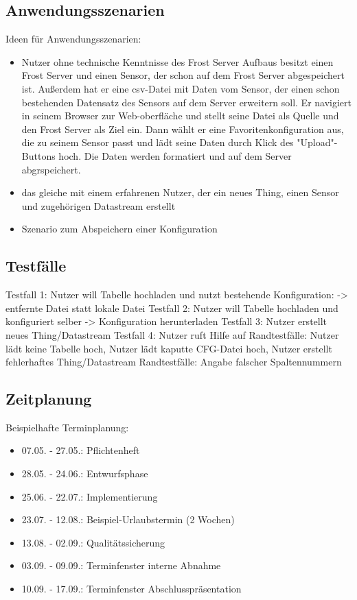 \documentclass[12 pt]{article}
\begin{document}
\subsection{Anwendungsszenarien}
Ideen für Anwendungsszenarien:
\begin{itemize}
\item Nutzer ohne technische Kenntnisse des Frost Server Aufbaus besitzt einen Frost Server und einen Sensor, der schon auf dem Frost Server abgespeichert ist. Außerdem hat er eine csv-Datei mit Daten vom Sensor, der einen schon bestehenden Datensatz des Sensors auf dem Server erweitern soll. Er navigiert in seinem Browser zur Web-oberfläche und stellt seine Datei als Quelle und den Frost Server als Ziel ein. Dann wählt er eine Favoritenkonfiguration aus, die zu seinem Sensor passt und lädt seine Daten durch Klick des "Upload"-Buttons hoch. Die Daten werden formatiert und auf dem Server abgrspeichert.
\item das gleiche mit einem erfahrenen Nutzer, der ein neues Thing, einen Sensor und zugehörigen Datastream erstellt
\item Szenario zum Abspeichern einer Konfiguration
\end{itemize}


\subsection{Testfälle}

Testfall 1: Nutzer will Tabelle hochladen und nutzt bestehende Konfiguration:
	-> entfernte Datei statt lokale Datei
Testfall 2: Nutzer will Tabelle hochladen und konfiguriert selber
	-> Konfiguration herunterladen
Testfall 3: Nutzer erstellt neues Thing/Datastream
Testfall 4: Nutzer ruft Hilfe auf
Randtestfälle: Nutzer lädt keine Tabelle hoch, Nutzer lädt kaputte CFG-Datei hoch, Nutzer erstellt fehlerhaftes Thing/Datastream
Randtestfälle: Angabe falscher Spaltennummern 



\subsection{Zeitplanung}
Beispielhafte Terminplanung: \\
\begin{itemize}
	\item 07.05. - 27.05.: Pflichtenheft
	\item 28.05. - 24.06.: Entwurfsphase
	\item 25.06. - 22.07.: Implementierung
	\item 23.07. - 12.08.: Beispiel-Urlaubstermin (2 Wochen)
	\item 13.08. - 02.09.: Qualitätssicherung
	\item 03.09. - 09.09.: Terminfenster interne Abnahme
	\item 10.09. - 17.09.: Terminfenster Abschlusspräsentation
\end{itemize}
\end{document}
